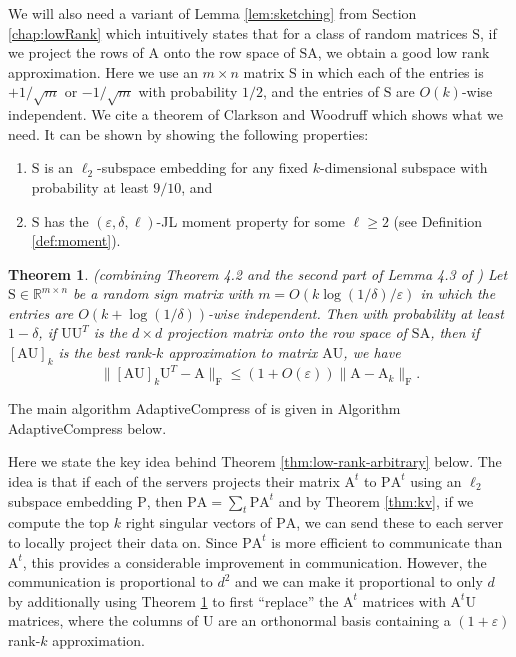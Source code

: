 \documentclass[11pt]{article}
\newcommand{\FNorm }[1]{\mbox{}\|#1\|_\mathrm{F}  }
\newtheorem{theorem}{Theorem}
\newcommand{\mat}[1]{{\ensuremath{\bm{\mathrm{#1}}}}}
\def\matA{\mat{A}}
\def\matP{\mat{P}}
\def\matS{\mat{S}}
\def\matU{\mat{U}}
\newcommand{\eps}{\varepsilon}
\begin{document}
We will also need a variant of Lemma \ref{lem:sketching} from Section \ref{chap:lowRank}
which intuitively states that for a class of random matrices $\matS$, if we project
the rows of $\matA$ onto the row space of $\matS \matA$, we obtain a good low rank approximation.   
Here we use an $m \times n$ matrix $\matS$ in which each of the
entries is $+1/\sqrt{m}$ or $-1/\sqrt{m}$ with probability $1/2$, 
and the entries of $\matS$ are $O(k)$-wise independent. We
cite a theorem of Clarkson and Woodruff \cite{CW09} which shows what we need.
It can be shown by showing the following properties:
\begin{enumerate}
\item $\matS$ is an $\ell_2$-subspace embedding for any fixed $k$-dimensional subspace with probability at least $9/10$, and
\item $\matS$ has the $(\eps, \delta, \ell)$-JL moment property for some $\ell \geq 2$ (see Definition \ref{def:moment}). 
\end{enumerate}
\begin{theorem}\label{thm:sketch}(combining Theorem 4.2 and the second part of Lemma 4.3 of \cite{CW09})
Let $\matS \in \mathbb{R}^{m \times n}$ be a random sign matrix with $m = O(k \log (1/\delta)/\eps)$ in which
the entries are $O(k + \log(1/\delta))$-wise independent.
Then with probability at least $1-\delta$, if $\matU \matU^T$ is the $d \times d$ projection matrix onto the row space of $\matS \matA$,
then if $[\matA \matU]_k$ is the best rank-$k$ approximation to matrix $\matA \matU$, we have
$$\FNorm{[\matA\matU]_k \matU^T-\matA} \leq (1+O(\eps))\FNorm{\matA-\matA_k}.$$
\end{theorem}
The main algorithm {\sc AdaptiveCompress} of \cite{kvw14} is given in Algorithm 
{\sf AdaptiveCompress} below.  

Here we state the key idea behind Theorem \ref{thm:low-rank-arbitrary} below. The idea is that
if each of the servers projects their matrix $\matA^t$ to $\matP\matA^t$ using an $\ell_2$
subspace embedding $\matP$, then $\matP \matA = \sum_t \matP \matA^t$ and by Theorem
\ref{thm:kv}, if we compute the top $k$ right singular vectors of $\matP\matA$, we can send
these to each server to locally project their data on. Since $\matP\matA^t$ is more efficient
to communicate than $\matA^t$, this provides a considerable improvement in communication. However,
the communication is proportional to $d^2$ and we can make it proportional to only $d$ 
by additionally using Theorem \ref{thm:sketch} to first ``replace'' the $\matA^t$ matrices
with $\matA^t \matU$ matrices, where the columns of $\matU$ are an orthonormal basis
containing a $(1+\eps)$ rank-$k$ approximation. 
\end{document}
